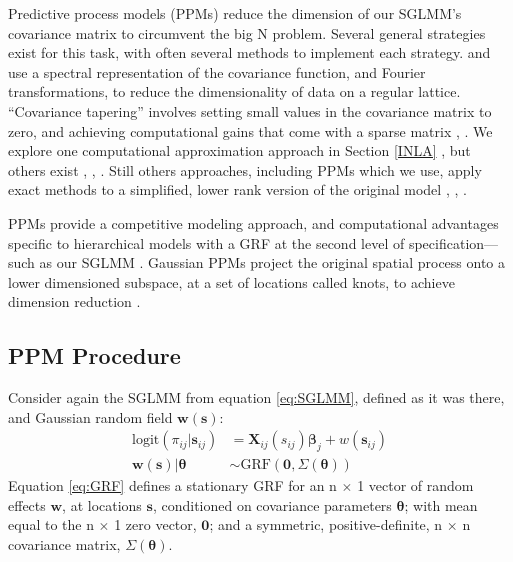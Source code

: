 Predictive process models (PPMs) reduce the dimension of our SGLMM's covariance matrix to circumvent the big N problem. Several general strategies exist for this task, with often several methods to implement each strategy. \cite{Fuentes2007} and \cite{Paciorek2007} use a spectral representation of the covariance function, and Fourier transformations, to reduce the dimensionality of data on a regular lattice. ``Covariance tapering'' involves setting small values in the covariance matrix to zero, and achieving computational gains that come with a sparse matrix \citep{Furrer2006}, \citep{Kaufman2008}. We explore one computational approximation approach in Section \ref{INLA} \citep{Rue2009}, but others exist \citep{Stein2004}, \citep{Eidsvik2014}, \citep{Aune2014}. Still others approaches, including PPMs which we use, apply exact methods to a simplified, lower rank version of the original model \citep{Cressie2008}, \citep{Higdon2002}, \citep{Eidsvik2012}.

PPMs provide a competitive modeling approach, and computational advantages specific to hierarchical models with a GRF at the second level of specification---such as our SGLMM \citep{Banerjee2008}. Gaussian PPMs project the original spatial process onto a lower dimensioned subspace, at a set of locations called knots, to achieve dimension reduction \citep{Banerjee2008}. 

\subsection{PPM Procedure}
Consider again the SGLMM from equation \ref{eq:SGLMM}, defined as it was there, and Gaussian random field $\pmb{w}(\pmb{s})$:
\begin{align}
\text{logit}(\pi_{ij}|\pmb{s}_{ij}) &= \pmb{X}_{ij}(s_{ij}) \pmb{\beta}_{j} + w(\pmb{s}_{ij}) \label{eq:orig} \\
\pmb{w}(\pmb{s}) | \pmb{\theta} &\sim \text{GRF}(\pmb{0}, \Sigma(\pmb{\theta})) \label{eq:GRF}
\end{align}
Equation \ref{eq:GRF} defines a stationary GRF for an n $\times$ 1 vector of random effects $\pmb{w}$, at locations $\pmb{s}$, conditioned on covariance parameters $\pmb{\theta}$; with mean equal to the n $\times$ 1 zero vector, $\pmb{0}$; and a symmetric, positive-definite, n $\times$ n covariance matrix, $\Sigma(\pmb{\theta})$.

